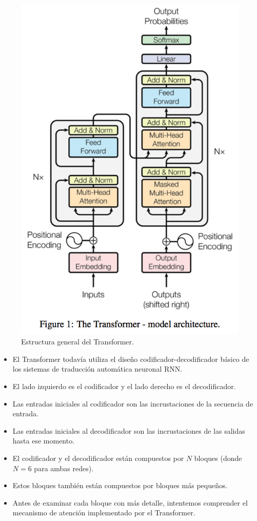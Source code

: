 \begin{figure}[h]
  \centering
  \includegraphics[scale=0.29]{pics/transformer.png}
  \caption{Estructura general del Transformer.}
\end{figure}
\begin{itemize}
  \item El Transformer todavía utiliza el diseño codificador-decodificador básico de los sistemas de traducción automática neuronal RNN.
  \item El lado izquierdo es el codificador y el lado derecho es el decodificador.
  \item Las entradas iniciales al codificador son las incrustaciones de la secuencia de entrada.
  \item Las entradas iniciales al decodificador son las incrustaciones de las salidas hasta ese momento.
  \item El codificador y el decodificador están compuestos por $N$ bloques (donde $N = 6$ para ambas redes).
  \item Estos bloques también están compuestos por bloques más pequeños.
  \item Antes de examinar cada bloque con más detalle, intentemos comprender el mecanismo de atención implementado por el Transformer.
\end{itemize}

